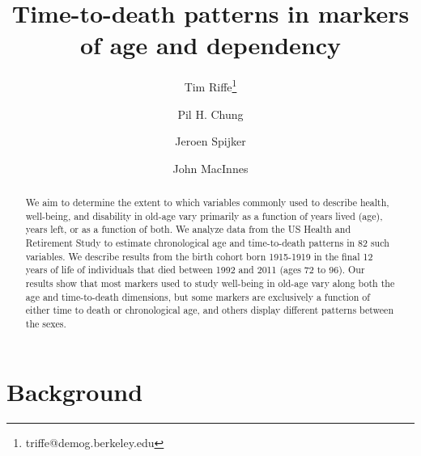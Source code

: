 \documentclass{article}
\begin{document}
\title{Time-to-death patterns in markers of age and dependency}

\author[1]{Tim Riffe\thanks{triffe@demog.berkeley.edu}}
\author[1]{Pil H. Chung}
\author[2,3]{Jeroen Spijker}
\author[4]{John MacInnes}

\maketitle

\begin{abstract}
We aim to determine the extent to which variables commonly
used to describe health, well-being, and disability in old-age vary primarily
as a function of years lived (age), years left, or as a function of both. We analyze data from the US Health and Retirement Study to estimate
chronological age and time-to-death patterns in 82 such variables. We describe
results from the birth cohort born 1915-1919 in the final 12 years of life of
individuals that died between 1992 and 2011 (ages 72 to 96). Our results show
that most markers used to study well-being in old-age vary along both the age
and time-to-death dimensions, but some markers are exclusively a function of
either time to death or chronological age, and others display different patterns
between the sexes.
\end{abstract}

\section*{Background}
\end{document}
